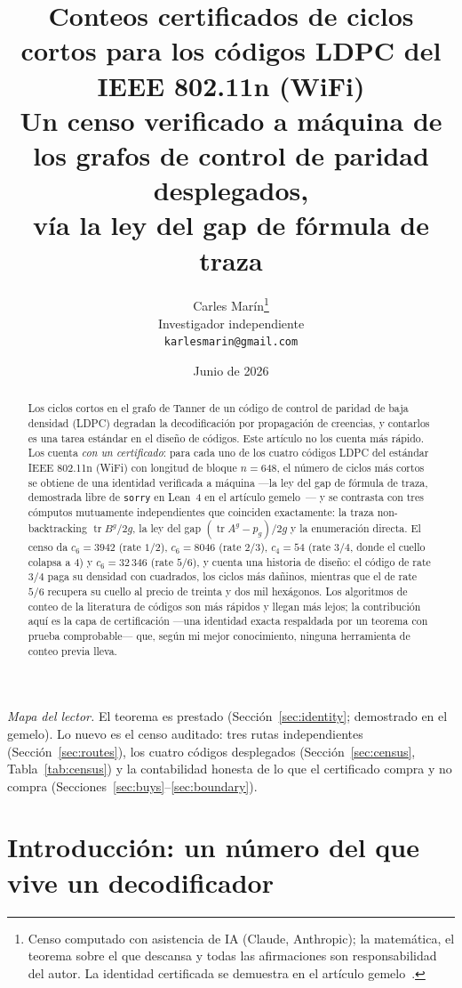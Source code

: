 \documentclass[11pt]{article}
\title{\bf Conteos certificados de ciclos cortos para los códigos LDPC del IEEE 802.11n
  (WiFi)\\[4pt]
  \large\normalfont Un censo verificado a máquina de los grafos de control de paridad
  desplegados,\\ vía la ley del gap de fórmula de traza}
\author{Carles Mar\'in\thanks{Censo computado con asistencia de IA (Claude, Anthropic); la
matemática, el teorema sobre el que descansa y todas las afirmaciones son responsabilidad
del autor. La identidad certificada se demuestra en el artículo
gemelo~\cite{MarinGapWindow2026}.}\\[3pt]
  \normalsize Investigador independiente\\
  \normalsize \texttt{karlesmarin@gmail.com}}
\date{Junio de 2026}
\newcommand{\lean}[1]{\texttt{#1}}
\DeclareMathOperator{\tr}{tr}
\begin{document}
\maketitle

\begin{abstract}
Los ciclos cortos en el grafo de Tanner de un código de control de paridad de baja densidad
(LDPC) degradan la decodificación por propagación de creencias, y contarlos es una tarea
estándar en el diseño de códigos. Este artículo no los cuenta más rápido. Los cuenta
\emph{con un certificado}: para cada uno de los cuatro códigos LDPC del estándar IEEE 802.11n
(WiFi) con longitud de bloque $n = 648$, el número de ciclos más cortos se obtiene de una
identidad verificada a máquina ---la ley del gap de fórmula de traza, demostrada libre de
\lean{sorry} en Lean~4 en el artículo gemelo~\cite{MarinGapWindow2026}--- y se contrasta con
tres cómputos mutuamente independientes que coinciden exactamente: la traza non-backtracking
$\tr B^g/2g$, la ley del gap $(\tr A^g - p_g)/2g$ y la enumeración directa. El censo da
$c_6 = 3942$ (rate $1/2$), $c_6 = 8046$ (rate $2/3$), $c_4 = 54$ (rate $3/4$, donde el cuello
colapsa a $4$) y $c_6 = 32\,346$ (rate $5/6$), y cuenta una historia de diseño: el código de
rate $3/4$ paga su densidad con cuadrados, los ciclos más dañinos, mientras que el de
rate $5/6$ recupera su cuello al precio de treinta y dos mil hexágonos. Los algoritmos de
conteo de la literatura de códigos son más rápidos y llegan más lejos; la contribución aquí
es la capa de certificación ---una identidad exacta respaldada por un teorema con prueba
comprobable--- que, según mi mejor conocimiento, ninguna herramienta de conteo previa lleva.
\end{abstract}

\noindent\emph{Mapa del lector.} El teorema es prestado (Sección~\ref{sec:identity};
demostrado en el gemelo). Lo nuevo es el censo auditado: tres rutas independientes
(Sección~\ref{sec:routes}), los cuatro códigos desplegados (Sección~\ref{sec:census},
Tabla~\ref{tab:census}) y la contabilidad honesta de lo que el certificado compra y no compra
(Secciones~\ref{sec:buys}--\ref{sec:boundary}).

\section{Introducción: un número del que vive un decodificador}
\label{sec:intro}
\end{document}
